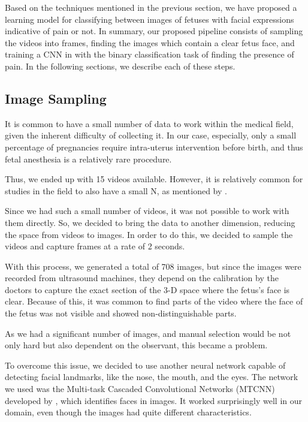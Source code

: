 Based on the techniques mentioned in the previous section, we have proposed a learning model for classifying between images of fetuses with facial expressions indicative of pain or not. In summary, our proposed pipeline consists of sampling the videos into frames, finding the images which contain a clear fetus face, and training a CNN in with the binary classification task of finding the presence of pain. In the following sections, we describe each of these steps.

\subsection{Image Sampling}

It is common to have a small number of data to work within the medical field, given the inherent difficulty of collecting it. In our case, especially, only a small percentage of pregnancies require intra-uterus intervention before birth, and thus fetal anesthesia is a relatively rare procedure. 

Thus, we ended up with 15 videos available. However, it is relatively common for studies in the field to also have a small N, as mentioned by \cite{ZamzmiPGKSA16}.

Since we had such a small number of videos, it was not possible to work with them directly. So, we decided to bring the data to another dimension, reducing the space from videos to images. In order to do this, we decided to sample the videos and capture frames at a rate of 2 seconds. 

With this process, we generated a total of 708 images, but since the images were recorded from ultrasound machines, they depend on the calibration by the doctors to capture the exact section of the 3-D space where the fetus's face is clear. Because of this, it was common to find parts of the video where the face of the fetus was not visible and showed non-distinguishable parts.

As we had a significant number of images, and manual selection would be not only hard but also dependent on the observant, this became a problem.

To overcome this issue, we decided to use another neural network capable of detecting facial landmarks, like the nose, the mouth, and the eyes. The network we used was the Multi-task Cascaded Convolutional Networks (MTCNN) developed by \cite{ZhangZL016}, which identifies faces in images. It worked surprisingly well in our domain, even though the images had quite different characteristics.

